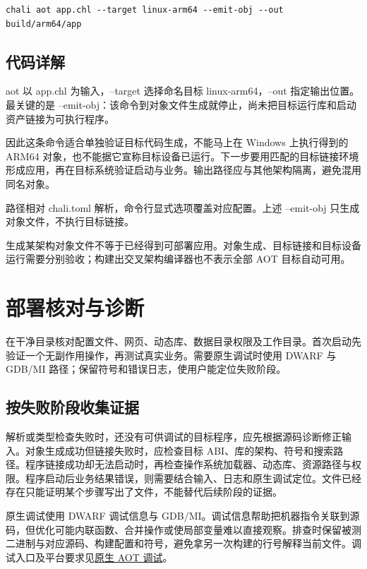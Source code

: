 \par
\medskip
\begin{lstlisting}[style=sh]
chali aot app.chl --target linux-arm64 --emit-obj --out build/arm64/app
\end{lstlisting}
\par
\medskip

\subsection*{代码详解}

aot 以 app.chl 为输入，--target 选择命名目标 linux-arm64，--out 指定输出位置。最关键的是 --emit-obj：该命令到对象文件生成就停止，尚未把目标运行库和启动资产链接为可执行程序。

因此这条命令适合单独验证目标代码生成，不能马上在 Windows 上执行得到的 ARM64 对象，也不能据它宣称目标设备已运行。下一步要用匹配的目标链接环境形成应用，再在目标系统验证启动与业务。输出路径应与其他架构隔离，避免混用同名对象。

路径相对 chali.toml 解析，命令行显式选项覆盖对应配置。上述 --emit-obj 只生成对象文件，不执行目标链接。

生成某架构对象文件不等于已经得到可部署应用。对象生成、目标链接和目标设备运行需要分别验收；构建出交叉架构编译器也不表示全部 AOT 目标自动可用。

\section{部署核对与诊断}

在干净目录核对配置文件、网页、动态库、数据目录权限及工作目录。首次启动先验证一个无副作用操作，再测试真实业务。需要原生调试时使用 DWARF 与 GDB/MI 路径；保留符号和错误日志，使用户能定位失败阶段。

\subsection*{按失败阶段收集证据}

解析或类型检查失败时，还没有可供调试的目标程序，应先根据源码诊断修正输入。对象生成成功但链接失败时，应检查目标 ABI、库的架构、符号和搜索路径。程序链接成功却无法启动时，再检查操作系统加载器、动态库、资源路径与权限。程序启动后业务结果错误，则需要结合输入、日志和原生调试定位。文件已经存在只能证明某个步骤写出了文件，不能替代后续阶段的证据。

原生调试使用 DWARF 调试信息与 GDB/MI。调试信息帮助把机器指令关联到源码，但优化可能内联函数、合并操作或使局部变量难以直接观察。排查时保留被测二进制与对应源码、构建配置和符号，避免拿另一次构建的行号解释当前文件。调试入口及平台要求见\href{https://github.com/rabbitc999/ChaLi/blob/master/doc/43-native-debugging.md}{原生 AOT 调试}。

